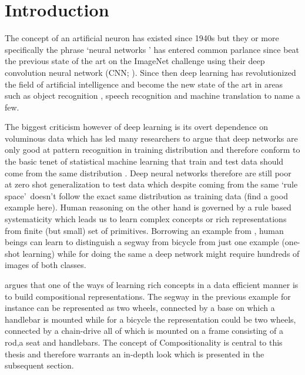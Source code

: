 \chapter{Introduction}
	
The concept of an artificial neuron has existed since 1940s \citep{McCulloch1943} but they or more specifically the phrase \lq neural networks \rq{} has entered common parlance since \cite{Krizhevsky2012} beat the previous state of the art on the ImageNet challenge \citep{Deng2009} using their deep convolution neural network (CNN; \citep{Lecun89}). Since then deep learning has revolutionized the field of artificial intelligence and become the new state of the art in areas such as object recognition \citep{He2015}, speech recognition \citep{Graves2013} and machine translation \citep{Sutskever2014} to name a few.

The biggest criticism however of deep learning is its overt dependence on voluminous data which has led many researchers to argue that deep networks are only good at pattern recognition in training distribution \citep{Marcus2018} and therefore conform to the basic tenet of statistical machine learning that train and test data should come from the same distribution \citep{Zadrozny:2004:LEC:1015330.1015425}. Deep neural networks therefore are still poor at zero shot generalization to test data which despite coming from the same \lq rule space{}\rq\ doesn't follow the exact same distribution as training data (find a good example here). Human reasoning on the other hand is governed by a rule based systematicity \citep{FODOR19883} which leads us to learn complex concepts or rich representations from finite (but small) set of primitives. Borrowing an example from \cite{Lake2016}, human beings can learn to distinguish a segway from bicycle from just one example (one-shot learning) while for doing the same a deep network might require hundreds of images of both classes. 

\cite{Lake2016} argues that one of the ways of learning rich concepts in a data efficient manner is to build compositional representations. The segway in the previous example for instance can be represented as two wheels, connected by a base on which a handlebar is mounted while for a bicycle the representation could be two wheels, connected by a chain-drive all of which is mounted on a frame consisting of a rod,a seat and handlebars. The concept of Compositionality is central to this thesis and therefore warrants an in-depth look which is presented in the subsequent section.

